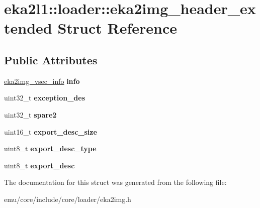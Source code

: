 \hypertarget{structeka2l1_1_1loader_1_1eka2img__header__extended}{}\section{eka2l1\+:\+:loader\+:\+:eka2img\+\_\+header\+\_\+extended Struct Reference}
\label{structeka2l1_1_1loader_1_1eka2img__header__extended}
\subsection*{Public Attributes}
\begin{DoxyCompactItemize}
\item 
\mbox{\label{structeka2l1_1_1loader_1_1eka2img__header__extended_a4871b42540ee80fc2334fadd52c91983}} 
\mbox{\hyperlink{structeka2l1_1_1loader_1_1eka2img__vsec__info}{eka2img\+\_\+vsec\+\_\+info}} {\bfseries info}
\item 
\mbox{\label{structeka2l1_1_1loader_1_1eka2img__header__extended_a94f8136904986d876c5a575b4483c60f}} 
uint32\+\_\+t {\bfseries exception\+\_\+des}
\item 
\mbox{\label{structeka2l1_1_1loader_1_1eka2img__header__extended_a33611333f1d9786bb2e53e931bd28f01}} 
uint32\+\_\+t {\bfseries spare2}
\item 
\mbox{\label{structeka2l1_1_1loader_1_1eka2img__header__extended_a69e2cdd1516fc8c054f04929efe25093}} 
uint16\+\_\+t {\bfseries export\+\_\+desc\+\_\+size}
\item 
\mbox{\label{structeka2l1_1_1loader_1_1eka2img__header__extended_a03c47fe34e64a508386fa40bf862ac7b}} 
uint8\+\_\+t {\bfseries export\+\_\+desc\+\_\+type}
\item 
\mbox{\label{structeka2l1_1_1loader_1_1eka2img__header__extended_a0c48b2e52c8be7b2cc096e003b00672f}} 
uint8\+\_\+t {\bfseries export\+\_\+desc}
\end{DoxyCompactItemize}


The documentation for this struct was generated from the following file\+:\begin{DoxyCompactItemize}
\item 
emu/core/include/core/loader/eka2img.\+h\end{DoxyCompactItemize}
